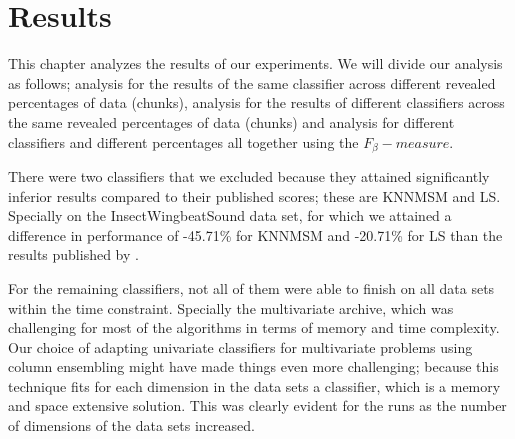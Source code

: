 \chapter{Results}
\label{ChapterResults}
This chapter analyzes the results of our experiments.
We will divide our analysis as follows;
analysis for the results of the same classifier across different revealed percentages of data (chunks),
analysis for the results of different classifiers across the same revealed percentages of data (chunks)
and analysis for different classifiers and different percentages all together using the $F_{\beta}-measure$.


There were two classifiers that we excluded because they attained significantly inferior results compared to their published scores; these are KNNMSM and LS.
Specially on the InsectWingbeatSound data set, for which we attained a difference in performance of -45.71\% for KNNMSM and -20.71\% for LS than the results published by \cite{bagnall2017great}.


For the remaining classifiers, not all of them were able to finish on all data sets within the time constraint.
Specially the multivariate archive, which was challenging for most of the algorithms in terms of memory and time complexity.
Our choice of adapting univariate classifiers for multivariate problems using column ensembling might have made things even more challenging;
because this technique fits for each dimension in the data sets a classifier, which is a memory and space extensive solution.
This was clearly evident for the runs as the number of dimensions of the data sets increased.

